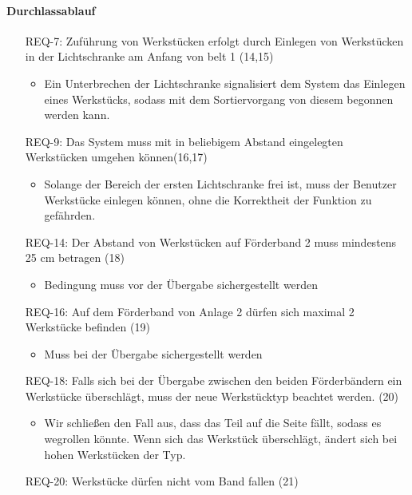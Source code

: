 \paragraph{Durchlassablauf}
\begin{itemize}
    \item[REQ-7:] Zuführung von Werkstücken erfolgt durch Einlegen von Werkstücken in der
    Lichtschranke am Anfang von \gls{belt} 1 (14,15)
    \begin{itemize}
        \item Ein Unterbrechen der Lichtschranke signalisiert dem System das Einlegen eines Werkstücks,
        sodass mit dem Sortiervorgang von diesem begonnen werden kann.
    \end{itemize}
    \item[REQ-9:] Das System muss mit in beliebigem Abstand eingelegten Werkstücken umgehen können(16,17)
    \begin{itemize}
        \item Solange der Bereich der ersten Lichtschranke frei ist, muss der Benutzer Werkstücke
        einlegen können, ohne die Korrektheit der Funktion zu gefährden.
    \end{itemize}
    \item[REQ-14:] Der Abstand von Werkstücken auf Förderband 2 muss mindestens 25 cm betragen (18)
    \begin{itemize}
        \item Bedingung muss vor der Übergabe sichergestellt werden
    \end{itemize}
    \item[REQ-16:] Auf dem Förderband von Anlage 2 dürfen sich maximal 2 Werkstücke befinden (19)
    \begin{itemize}
        \item Muss bei der Übergabe sichergestellt werden
    \end{itemize}
    \item[REQ-18:] Falls sich bei der Übergabe zwischen den beiden Förderbändern ein Werkstücke
    überschlägt, muss der neue Werkstücktyp beachtet werden. (20)
    \begin{itemize}
        \item Wir schließen den Fall aus, dass das Teil auf die Seite fällt, sodass es wegrollen könnte.
        Wenn sich das Werkstück überschlägt, ändert sich bei hohen Werkstücken der Typ.
    \end{itemize}
    \item[REQ-20:] Werkstücke dürfen nicht vom Band fallen (21)

\end{itemize}
